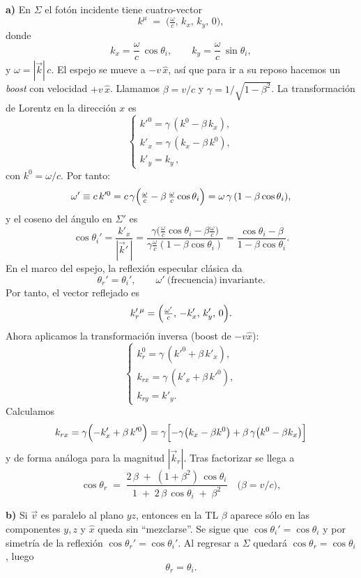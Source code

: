 \documentclass{article}
\begin{document}
\textbf{a) } 
En \(\Sigma\) el fotón incidente tiene cuatro-vector
\[
k^\mu \;=\;\bigl(\tfrac{\omega}{c},\,k_x,\,k_y,\,0\bigr),
\]
donde
\[
k_x = \frac{\omega}{c}\,\cos\theta_i,
\qquad
k_y = \frac{\omega}{c}\,\sin\theta_i,
\]
y \(\omega=|\vec k|\,c\).
El espejo se mueve a \(-v\,\hat x\), así que para ir a su reposo hacemos un \emph{boost} con velocidad \(+\!v\,\hat x\). Llamamos \(\beta=v/c\) y
\(\gamma=1/\sqrt{1-\beta^2}\). La transformación de Lorentz en la dirección \(x\) es
\[
\begin{cases}
k'^0 = \gamma\,(k^0 - \beta\,k_x),\\[6pt]
k'_x = \gamma\,(k_x - \beta\,k^0),\\[3pt]
k'_y = k_y\,,
\end{cases}
\]
con \(k^0=\omega/c\). Por tanto:
\[
\omega'\equiv c\,k'^0
= c\,\gamma\Bigl(\tfrac{\omega}{c}-\beta\,\tfrac{\omega}{c}\cos\theta_i\Bigr)
=\omega\,\gamma\,(1-\beta\cos\theta_i),
\]
y el coseno del ángulo en \(\Sigma'\) es
\[
\cos\theta_i'
=\frac{k'_x}{|\vec k'\,|}
=\frac{\gamma\bigl(\frac{\omega}{c}\cos\theta_i-\beta\frac{\omega}{c}\bigr)}
      {\gamma\frac{\omega}{c}(1-\beta\cos\theta_i)}
=\frac{\cos\theta_i-\beta}{1-\beta\cos\theta_i}.
\]
En el marco del espejo, la reflexión especular clásica da
\[
\theta_r'=\theta_i',
\qquad
\omega'\ \text{(frecuencia)}\ \text{invariante}.
\]
Por tanto, el vector reflejado es
\[
k_r'{}^\mu
=\Bigl(\tfrac{\omega'}{c},\,-k'_x,\,k'_y,\,0\Bigr).
\]
Ahora aplicamos la transformación inversa (boost de \(-v\hat x\)):
\[
\begin{cases}
k^0_r = \gamma\,(k'^0 + \beta\,k'_x),\\[6pt]
k_{r x} = \gamma\,(k'_x + \beta\,k'^0),\\[3pt]
k_{r y} = k'_y.
\end{cases}
\]
Calculamos
\[
k_{r x}
= \gamma\Bigl(-k'_x + \beta\,k'^0\Bigr)
= \gamma\Bigl[-\gamma\bigl(k_x-\beta k^0\bigr)
               +\beta\,\gamma\bigl(k^0-\beta k_x\bigr)\Bigr]
\]
y de forma análoga para la magnitud $|\vec k_r|$.  
Tras factorizar se llega a
\[
\boxed{
\cos\theta_r \;=\;
\frac{2\,\beta \;+\; (1+\beta^2)\,\cos\theta_i}
     {1 \;+\;2\,\beta\,\cos\theta_i\;+\;\beta^2}
}
\quad\bigl(\beta=v/c\bigr),
\]


\textbf{b)} Si \(\vec v\) es paralelo al plano \(yz\), entonces en la TL
\(\beta\) aparece sólo en las componentes \(y,z\) y \(\hat x\)
queda sin “mezclarse”. Se sigue que
\(\cos\theta_i'=\cos\theta_i\) y por simetría de la reflexión
\(\cos\theta_r'=\cos\theta_i'\). Al regresar a \(\Sigma\)
quedará \(\cos\theta_r=\cos\theta_i\), luego
\[
\theta_r=\theta_i.
\]
\end{document}
